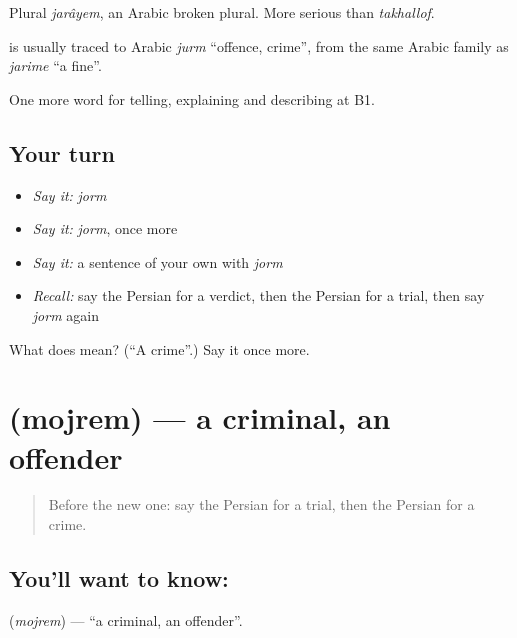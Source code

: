 Plural \emph{jarâyem}, an Arabic broken plural. More serious than \emph{takhallof}.

\begin{cousinweb}
\textbf{} is usually traced to Arabic \emph{jurm} \textquotedblleft{}offence, crime\textquotedblright{}, from the same Arabic family as \emph{jarime} \textquotedblleft{}a fine\textquotedblright{}.
\end{cousinweb}

\begin{grammarlens}[title={What you've built}]
One more word for telling, explaining and describing at B1.
\end{grammarlens}

\subsection*{Your turn}
\begin{itemize}
\raggedright
  \item \emph{Say it:} \emph{jorm}
  \item \emph{Say it:} \emph{jorm}, once more
  \item \emph{Say it:} a sentence of your own with \emph{jorm}
  \item \emph{Recall:} say the Persian for a verdict, then the Persian for a trial, then say \emph{jorm} again
\end{itemize}

\begin{tcolorbox}[breakable,colback=teal!4,colframe=teal!35!black,title={Before you move on}]
What does  mean? (\textquotedblleft{}A crime\textquotedblright{}.) Say it once more.
\end{tcolorbox}
\section[\texorpdfstring{\fa{مجرم} (mojrem)}{مجرم (mojrem)}]{ (mojrem) — a criminal, an offender}

\label{lesson:FA-C407-mojrem}



\begin{quote}
Before the new one: say the Persian for a trial, then the Persian for a crime.
\end{quote}

\subsection*{You'll want to know: }
\textbf{} (\emph{mojrem}) — \textquotedblleft{}a criminal, an offender\textquotedblright{}.


